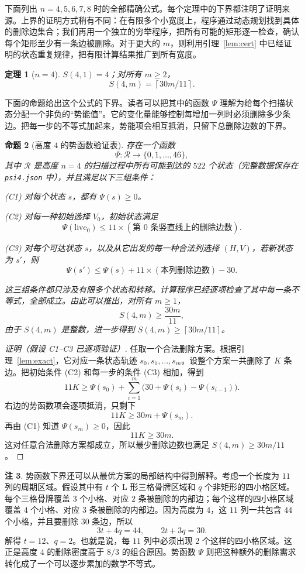 \documentclass[11pt]{ctexart}
\newtheorem{theorem}{定理}[section]
\newtheorem{proposition}[theorem]{命题}
\theoremstyle{definition}
\newtheorem{remark}[theorem]{注}
\newcommand{\ceil}[1]{\left\lceil #1 \right\rceil}
\begin{document}
下面列出 $n=4,5,6,7,8$ 时的全部精确公式。每个定理中的下界都注明了证明来源。上界的证明方式稍有不同：在有限多个小宽度上，程序通过动态规划找到具体的删除边集合；我们再用一个独立的穷举程序，把所有可能的矩形逐一检查，确认每个矩形至少有一条边被删除。对于更大的 $m$，则利用引理~\ref{lem:cert} 中已经证明的状态重复规律，把有限计算结果推广到所有宽度。

\begin{theorem}[$n=4$]\label{thm:n4}
$S(4,1)=4$；对所有 $m\ge2$，
\[
S(4,m)=\ceil{30m/11}.
\]
\end{theorem}

下面的命题给出这个公式的下界。读者可以把其中的函数 $\Psi$ 理解为给每个扫描状态分配一个非负的“势能值”。它的变化量能够控制每增加一列时必须删除多少条边。把每一步的不等式加起来，势能项会相互抵消，只留下总删除边数的下界。

\begin{proposition}[高度 $4$ 的势函数验证表]\label{prop:psi}
存在一个函数
\[
\Psi:\mathcal R\longrightarrow\{0,1,\ldots,46\},
\]
其中 $\mathcal R$ 是高度 $n=4$ 的扫描过程中所有可能到达的 $522$ 个状态（完整数据保存在 \texttt{psi4.json} 中），并且满足以下三组条件：

\emph{(C1)} 对每个状态 $s$，都有 $\Psi(s)\ge0$。

\emph{(C2)} 对每一种初始选择 $V_0$，初始状态满足
\[
\Psi(\mathrm{live}_0)\le
11\times(\text{第 }0\text{ 条竖直线上的删除边数}).
\]

\emph{(C3)} 对每个可达状态 $s$，以及从它出发的每一种合法列选择 $(H,V)$，若新状态为 $s'$，则
\[
\Psi(s')\le
\Psi(s)+11\times(\text{本列删除边数})-30.
\]

这三组条件都只涉及有限多个状态和转移。计算程序已经逐项检查了其中每一条不等式，全部成立。由此可以推出，对所有 $m\ge1$，
\[
S(4,m)\ge\frac{30m}{11},
\]
由于 $S(4,m)$ 是整数，进一步得到
$S(4,m)\ge\ceil{30m/11}$。
\end{proposition}

\begin{proof}[证明（假设 C1--C3 已逐项验证）]
任取一个合法删除方案。根据引理~\ref{lem:exact}，它对应一条状态轨迹
$s_0,s_1,\ldots,s_m$。设整个方案一共删除了 $K$ 条边。把初始条件 (C2) 和每一步的条件 (C3) 相加，得到
\[
11K
\ge
\Psi(s_0)+\sum_{i=1}^{m}
\bigl(30+\Psi(s_i)-\Psi(s_{i-1})\bigr).
\]
右边的势函数项会逐项抵消，只剩下
\[
11K\ge30m+\Psi(s_m).
\]
再由 (C1) 知道 $\Psi(s_m)\ge0$，因此
\[
11K\ge30m.
\]
这对任意合法删除方案都成立，所以最少删除边数也满足
$S(4,m)\ge30m/11$。
\end{proof}

\begin{remark}
势函数下界还可以从最优方案的局部结构中得到解释。考虑一个长度为 $11$ 列的周期区域。假设其中有 $t$ 个 L 形三格骨牌区域和 $q$ 个非矩形的四小格区域。每个三格骨牌覆盖 $3$ 个小格、对应 $2$ 条被删除的内部边；每个这样的四小格区域覆盖 $4$ 个小格、对应 $3$ 条被删除的内部边。因为高度为 $4$，这 $11$ 列一共包含 $44$ 个小格，并且要删除 $30$ 条边，所以
\[
3t+4q=44,\qquad 2t+3q=30.
\]
解得 $t=12$、$q=2$。也就是说，每 $11$ 列中必须出现 $2$ 个这样的四小格区域。这正是高度 $4$ 的删除密度高于 $8/3$ 的组合原因。势函数 $\Psi$ 则把这种额外的删除需求转化成了一个可以逐步累加的数学不等式。
\end{remark}
\end{document}
